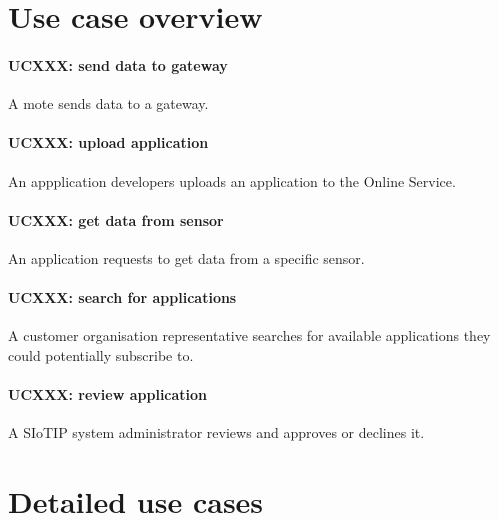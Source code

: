 \section{Use case overview}\label{sec:uc_overview}

\paragraph{UCXXX: send data to gateway}
A mote sends data to a gateway.
\paragraph{UCXXX: upload application}
An appplication developers uploads an application to the Online Service.
\paragraph{UCXXX: get data from sensor}
An application requests to get data from a specific sensor.
\paragraph{UCXXX: search for applications}
A customer organisation representative searches for available applications they
could potentially subscribe to.
\paragraph{UCXXX: review application}
A SIoTIP system administrator reviews and approves or declines it.

\section{Detailed use cases}

